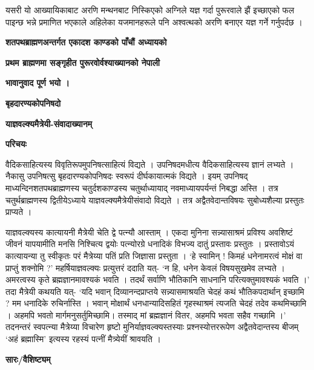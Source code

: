 \documentclass[11pt, a5paper]{article}
\begin{document}
यसरी यो आख्यायिकाबाट अरणि मन्थनबाट निस्किएको अग्निले यज्ञ गर्दा पुरूरवाले झैं इच्छाएको फल पाइन्छ भन्ने प्रमाणित भएकाले अहिलेका यजमानहरूले पनि अश्वत्थको अरणि बनाएर यज्ञ गर्ने गर्नुपर्दछ ।

\textbf{शतपथब्राह्मणअन्तर्गत एकादश काण्डको पाँचौं अध्यायको}

\textbf{प्रथम ब्राह्मणमा सङ्‌गृहीत पुरूरवोर्वश्याख्यानको नेपाली}

\textbf{भावानुवाद पूर्ण भयो ।}

\textbf{बृहदारण्यकोपनिषदो}

\textbf{याज्ञवल्क्यमैत्रेयी-संवादाख्यानम्}

\textbf{परिचयः}

वैदिकसाहित्यस्य विवृतिरूपमुपनिषत्साहित्यं विद्यते । उपनिषदमधीत्य वैदिकसाहित्यस्य ज्ञानं लभ्यते । नैकासु उपनिषत्सु बृहदारण्यकोपनिषदः स्वरूपं दीर्घकायात्मकं विद्यते । इयम् उपनिषद् माध्यन्दिनशतपथब्राह्मणस्य चतुर्दशकाण्डस्य चतुर्थाध्यायाद् नवमाध्यायपर्यन्तं निबद्धा अस्ति । तत्र चतुर्थब्राह्मणस्य द्वितीयेऽध्याये याज्ञवल्क्यमैत्रेयीसंवादो विद्यते । तत्र अद्वैतवेदान्तविषयः सुबोध्यशैल्या प्रस्तुतः प्राप्यते ।

याज्ञवल्क्यस्य कात्यायनी मैत्रेयी चेति द्वे पत्न्यौ आस्ताम् । एकदा मुनिना सन्न्यासाश्रमं प्रविश्य अवशिष्टं जीवनं यापयामीति मनसि निश्चित्य द्वयोः पत्न्योरग्रे धनादिकं विभज्य दातुं प्रस्तावः प्रस्तुतः । प्रस्तावोऽयं कात्यायन्या तु स्वीकृतः परं मैत्रेय्या पतिं प्रति जिज्ञासा प्रस्तुता । ‘हे स्वामिन् ! किमहं धनेनामरत्वं मोक्षं वा प्राप्तुं शक्नोमि ?’ महर्षियाज्ञवल्क्यः प्रत्युत्तरं ददाति यत्- ‘न हि, धनेन केवलं विषयसुखमेव लभ्यते । अमरत्वस्य कृते ब्रह्मज्ञानमावश्यकं भवति । तदर्थं सर्वाणि भौतिकानि साधनानि परित्यक्तुमावश्यकं भवति ।’ तदा मैत्रेयी कथयति यत्- ‘यदि भवान् दिव्यानन्दप्राप्तये सन्न्यासमाश्रयति चेदहं कथं भौतिकपदार्थान् इच्छामि ? मम धनादिके रुचिर्नास्ति । भवान् मोक्षार्थं धनधान्यादिसहितं गृहस्थाश्रमं त्यजति चेदहं तदेव कथमिच्छामि । अहमपि भवतो मार्गमनुसर्तुमिच्छामि। तस्माद् मां ब्रह्मज्ञानं वितर, अहमपि भवता सहैव गच्छामि ।’ तदनन्तरं स्वपत्न्या मैत्रेय्या विचारेण हृष्टो मुनिर्याज्ञवल्क्यस्तस्याः प्रश्नस्योत्तररूपेण अद्वैतवेदान्तस्य बीजम् `अहं ब्रह्मास्मि' इत्यस्य रहस्यं पत्नीं मैत्र्येयीं श्रावयति ।

\textbf{सारः/वैशिष्ट्यम्}
\end{document}
